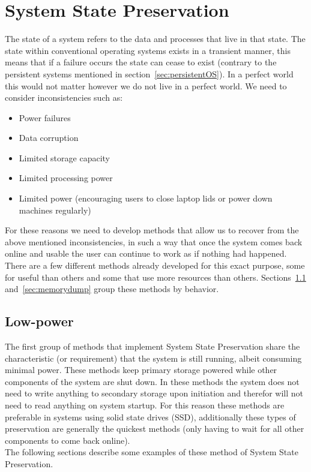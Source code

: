 \documentclass[a4paper,12pt]{article}
\begin{document}
\section{System State Preservation}\label{sec:preservation}
The state of a system refers to the data and processes that live in that state. The state within conventional operating systems exists in a transient manner, this means that if a failure occurs the state can cease to exist (contrary to the persistent systems mentioned in section~\ref{sec:persistentOS}). In a perfect world this would not matter however we do not live in a perfect world. We need to consider inconsistencies such as:
\begin{itemize}
    \item{Power failures}
    \item{Data corruption}
    \item{Limited storage capacity}
    \item{Limited processing power}
    \item{Limited power (encouraging users to close laptop lids or power down machines regularly)}
\end{itemize}
For these reasons we need to develop methods that allow us to recover from the above mentioned inconsistencies, in such a way that once the system comes back online and usable the user can continue to work as if nothing had happened.
\\There are a few different methods already developed for this exact purpose, some for useful than others and some that use more resources than others. Sections~\ref{sec:lowpower} and~\ref{sec:memorydump} group these methods by behavior.

\subsection{Low-power}\label{sec:lowpower}
The first group of methods that implement System State Preservation share the characteristic (or requirement) that the system is still running, albeit consuming minimal power. These methods keep primary storage powered while other components of the system are shut down. In these methods the system does not need to write anything to secondary storage upon initiation and therefor will not need to read anything on system startup. For this reason these methods are preferable in systems using solid state drives (SSD), additionally these types of preservation are generally the quickest methods (only having to wait for all other components to come back online).
\\The following sections describe some examples of these method of System State Preservation.
\end{document}
